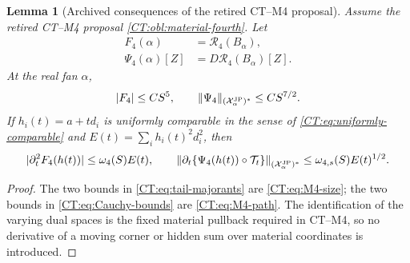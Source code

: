 \documentclass[11pt]{amsart}
\numberwithin{equation}{section}
\newtheorem{lemma}[theorem]{Lemma}
\theoremstyle{definition}
\theoremstyle{remark}
\newcommand{\Xjp}{\mathcal X^{\rm JP}}
\begin{document}
\begin{lemma}[Archived consequences of the retired CT--M4 proposal]
\label{CT:lem:Cauchy}
Assume the retired CT--M4 proposal \ref{CT:obl:material-fourth}.  Let
\begin{align*}
 F_4(\alpha)&=\mathcal R_4(B_\alpha),\\
 \Psi_4(\alpha)[Z]&=D\mathcal R_4(B_\alpha)[Z].
\end{align*}
At the real fan $\alpha$,
\begin{equation}\label{CT:eq:tail-majorants}
 |F_4|\le CS^5,\qquad
 \|\Psi_4\|_{(\Xjp_\alpha)^*}\le CS^{7/2}.
\end{equation}
If $h_i(t)=a+t d_i$ is uniformly comparable in the sense of
\eqref{CT:eq:uniformly-comparable} and
$E(t)=\sum_i h_i(t)^2d_i^2$, then
\begin{equation}\label{CT:eq:Cauchy-bounds}
 |\partial_t^2F_4(h(t))|\le \omega_4(S)E(t),
 \qquad
 \left\|\partial_t\{\Psi_4(h(t))\circ\mathcal T_t\}
     \right\|_{(\Xjp_\alpha)^*}
 \le \omega_{4,s}(S)E(t)^{1/2}.
\end{equation}
\end{lemma}

\begin{proof}
The two bounds in \eqref{CT:eq:tail-majorants} are
\eqref{CT:eq:M4-size}; the two bounds in \eqref{CT:eq:Cauchy-bounds} are
\eqref{CT:eq:M4-path}.  The identification of the varying dual spaces is the
fixed material pullback required in CT--M4, so no derivative of a moving
corner or hidden sum over material coordinates is introduced.
\end{proof}
\end{document}
